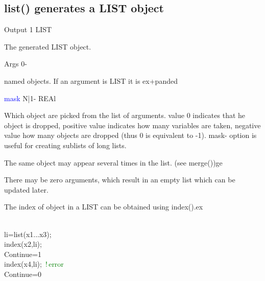 \begin{itemize}
\subsection{\textcolor{VioletRed}{list}() generates a LIST object}
\label{list}
\vspace{0.3cm}
\hline
\vspace{0.3cm}
\noindent Output \tabto{3cm}  1 \tabto{5cm}   LIST  \tabto{7cm}
\begin{changemargin}{3cm}{0cm}
\noindent The generated LIST object.
\end{changemargin}
\vspace{0.3cm}
\hline
\vspace{0.3cm}
\noindent Args \tabto{3cm}  0-  \tabto{5cm}     \tabto{7cm}
\begin{changemargin}{3cm}{0cm}
\noindent  named objects. If an argument is LIST it is ex+panded
\end{changemargin}
\vspace{0.3cm}
\hline
\vspace{0.3cm}
\noindent \textcolor{blue}{mask} \tabto{3cm}  N|1-  \tabto{5cm}  REAl \tabto{7cm}
\begin{changemargin}{3cm}{0cm}
\noindent  Which object are picked from the list of arguments.\ta
value 0 indicates that
he object is dropped, positive value indicates how many variables are taken,
negative value how many objects are dropped (thus 0 is equivalent to -1). mask-
option is useful for creating sublists of long lists.
\end {changemargin}
\hline
\vspace{0.2cm}
\begin{note}
The same object may appear several times in the list. (see \textcolor{VioletRed}{merge}())ge
\end{note}
\begin{note}
There may be zero arguments, which result in an empty list
which can be updated later.
\end{note}
\begin{note}
The index of object in a LIST can be obtained using \textcolor{VioletRed}{index}().ex
\end{note}
\\
li=\textcolor{VioletRed}{list}(x1...x3);
\\
\textcolor{VioletRed}{index}(x2,li);
\\
Continue=1
\\
\textcolor{VioletRed}{index}(x4,li); \,\textcolor{green}{!\,error}
\\
Continue=0
\\



\end{itemize}
